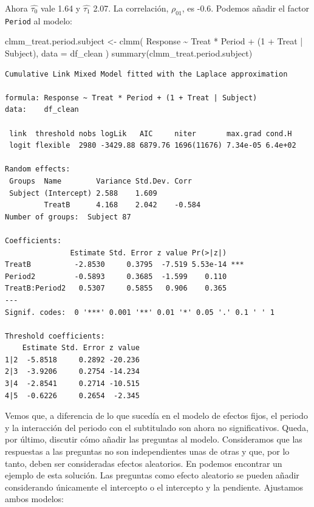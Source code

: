 \documentclass[
  12pt,
  a4paper,
  extrafontsizes,
  onecolumn,
  openright]{memoir}
\newenvironment{Shaded}{\begin{snugshade}}{\end{snugshade}}
\newcommand{\AttributeTok}[1]{\textcolor[rgb]{0.40,0.45,0.13}{#1}}
\newcommand{\DecValTok}[1]{\textcolor[rgb]{0.68,0.00,0.00}{#1}}
\newcommand{\FunctionTok}[1]{\textcolor[rgb]{0.28,0.35,0.67}{#1}}
\newcommand{\NormalTok}[1]{\textcolor[rgb]{0.00,0.23,0.31}{#1}}
\newcommand{\OtherTok}[1]{\textcolor[rgb]{0.00,0.23,0.31}{#1}}
\newcommand{\SpecialCharTok}[1]{\textcolor[rgb]{0.37,0.37,0.37}{#1}}
\begin{document}
\normalsize

Ahora \(\widehat{\tau_0}\) vale 1.64 y \(\widehat{\tau_1}\) 2.07. La
correlación, \(\rho_{01}\), es -0.6. Podemos añadir el factor
\texttt{Period} al modelo:

\scriptsize

\begin{Shaded}
\begin{Highlighting}[]
\NormalTok{clmm\_treat.period.subject }\OtherTok{\textless{}{-}} \FunctionTok{clmm}\NormalTok{(}
\NormalTok{    Response }\SpecialCharTok{\textasciitilde{}}\NormalTok{ Treat }\SpecialCharTok{*}\NormalTok{ Period }\SpecialCharTok{+}\NormalTok{ (}\DecValTok{1} \SpecialCharTok{+}\NormalTok{ Treat }\SpecialCharTok{|}\NormalTok{ Subject),}
    \AttributeTok{data =}\NormalTok{ df\_clean}
\NormalTok{)}
\FunctionTok{summary}\NormalTok{(clmm\_treat.period.subject)}
\end{Highlighting}
\end{Shaded}

\begin{verbatim}
Cumulative Link Mixed Model fitted with the Laplace approximation

formula: Response ~ Treat * Period + (1 + Treat | Subject)
data:    df_clean

 link  threshold nobs logLik   AIC     niter       max.grad cond.H 
 logit flexible  2980 -3429.88 6879.76 1696(11676) 7.34e-05 6.4e+02

Random effects:
 Groups  Name        Variance Std.Dev. Corr   
 Subject (Intercept) 2.588    1.609           
         TreatB      4.168    2.042    -0.584 
Number of groups:  Subject 87 

Coefficients:
               Estimate Std. Error z value Pr(>|z|)    
TreatB          -2.8530     0.3795  -7.519 5.53e-14 ***
Period2         -0.5893     0.3685  -1.599    0.110    
TreatB:Period2   0.5307     0.5855   0.906    0.365    
---
Signif. codes:  0 '***' 0.001 '**' 0.01 '*' 0.05 '.' 0.1 ' ' 1

Threshold coefficients:
    Estimate Std. Error z value
1|2  -5.8518     0.2892 -20.236
2|3  -3.9206     0.2754 -14.234
3|4  -2.8541     0.2714 -10.515
4|5  -0.6226     0.2654  -2.345
\end{verbatim}

\normalsize

Vemos que, a diferencia de lo que sucedía en el modelo de efectos fijos,
el periodo y la interacción del periodo con el subtitulado son ahora no
significativos. Queda, por último, discutir cómo añadir las preguntas al
modelo. Consideramos que las respuestas a las preguntas no son
independientes unas de otras y que, por lo tanto, deben ser consideradas
efectos aleatorios. En \textcite[pp.~19-20]{burkner2019} podemos
encontrar un ejemplo de esta solución. Las preguntas como efecto
aleatorio se pueden añadir considerando únicamente el intercepto o el
intercepto y la pendiente. Ajustamos ambos modelos:
\end{document}
